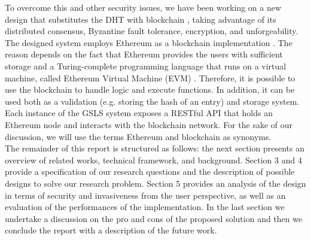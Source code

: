To overcome this and other security issues, we have been working on a new design that substitutes the DHT with blockchain \cite{nakamoto_bitcoin_2008}, taking advantage of its distributed consensus, Byzantine fault tolerance, encryption, and unforgeability. The designed system employs Ethereum as a blockchain implementation \cite{wood_ethereum_2014}. The reason depends on the fact that Ethereum provides the users with sufficient storage and a Turing-complete programming language that runs on a virtual machine, called Ethereum Virtual Machine (EVM) \cite{wood_ethereum_2014}. Therefore, it is possible to use the blockchain to handle logic and execute functions. In addition, it can be used both as a validation (e.g. storing the hash of an entry) and storage system. 
\\

Each instance of the GSLS system exposes a RESTful API that holds an Ethereum node and interacts with the blockchain network. For the sake of our discussion, we will use the terms Ethereum and blockchain as synonyms.
\\

The remainder of this report is structured as follows: the next section presents an overview of related works, technical framework, and background. Section 3 and 4 provide a specification of our research questions and the description of possible designs to solve our research problem. Section 5 provides an analysis of the design in terms of security and invasiveness from the user perspective, as well as an evaluation of the performances of the implementation. In the last section we undertake a discussion on the pro and cons of the proposed solution and then we conclude the report with a description of the future work. 
